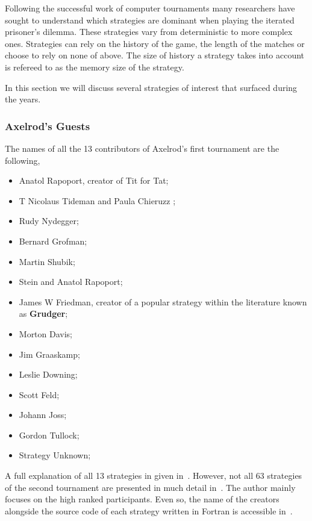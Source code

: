 \documentclass{article}
\begin{document}
Following the successful work of computer tournaments many researchers have sought
to understand which strategies are dominant when playing the iterated prisoner's
dilemma. These strategies vary from deterministic to more complex ones.
Strategies can rely on the history of the game, the length of the matches or 
choose to rely on none of above. The size of history a strategy takes into account
is refereed to as the memory size of the strategy. 

In this section we will discuss several strategies of interest that surfaced
during the years.

\subsubsection{Axelrod's Guests}\label{subsection:axelrods_guests}

The names of all the 13 contributors of Axelrod's first tournament are the 
following, 

\begin{itemize}
    \item Anatol Rapoport, creator of Tit for Tat;
    \item T Nicolaus Tideman and Paula Chieruzz	;
    \item Rudy Nydegger;
    \item Bernard Grofman;
    \item Martin Shubik;
    \item Stein and Anatol Rapoport;
    \item James W Friedman, creator of a popular strategy within the literature 
    known as \textbf{Grudger};
    \item Morton Davis;
    \item Jim Graaskamp; 
    \item Leslie Downing; 
    \item Scott Feld; 
    \item Johann Joss; 
    \item Gordon Tullock; 
    \item Strategy Unknown; 
\end{itemize}

A full explanation of all 13 strategies in given in~\cite{Axelrod1981}.
However, not all 63 strategies of the second tournament are presented 
in much detail in~\cite{Axelrod1981}. The author mainly focuses on the high ranked
participants. Even so, the name of the creators alongside the source code of each 
strategy written in Fortran is accessible in~\cite{fortan_code}.
\end{document}
